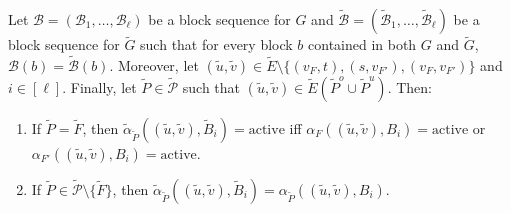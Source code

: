 \documentclass[fontsize=11pt,paper=a4]{book}
\begin{document}
\begin{lem}
Let \(\mathcal{B}=(\mathscr{B}_1,\dots,\mathscr{B}_{\ell})\) be a block sequence for \(G\) and \(\tilde{\mathcal{B}}=(\tilde{\mathscr{B}}_1,\dots,\tilde{\mathscr{B}}_{\ell})\) be a block sequence for \(\tilde{G}\) such that for every block \(b\) contained in both \(G\) and \(\tilde{G}\), \(\mathcal{B}(b)=\tilde{\mathcal{B}}(b)\).
Moreover, let \((\tilde{u},\tilde{v})\in\tilde{E}\setminus\{(v_F,t),(s,v_{F'}),(v_F,v_{F'})\}\) and \(i\in[\ell]\).
Finally, let \(\tilde{P}\in\tilde{\mathcal{P}}\) such that \((\tilde{u},\tilde{v})\in\tilde{E}(\tilde{P}^o\cup\tilde{P}^u)\).
Then:

\begin{enumerate}
\item \label{itm:lem-alpha-1}
If \(\tilde{P}=\tilde{F}\), then \(\tilde{\alpha}_{\tilde{P}}((\tilde{u},\tilde{v}),\tilde{B}_i)=\mathrm{active}\) iff \(\alpha_F((\tilde{u},\tilde{v}),B_i)=\mathrm{active}\) or \(\alpha_{F'}((\tilde{u},\tilde{v}),B_i)=\mathrm{active}\).

\item \label{itm:lem-alpha-2}
If \(\tilde{P}\in\tilde{\mathcal{P}}\setminus\{\tilde{F}\}\), then \(\tilde{\alpha}_{\tilde{P}}((\tilde{u},\tilde{v}),\tilde{B}_i)=\alpha_{\tilde{P}}((\tilde{u},\tilde{v}),B_i)\).
\end{enumerate}
\label{org189e536}
\end{lem}
\end{document}
